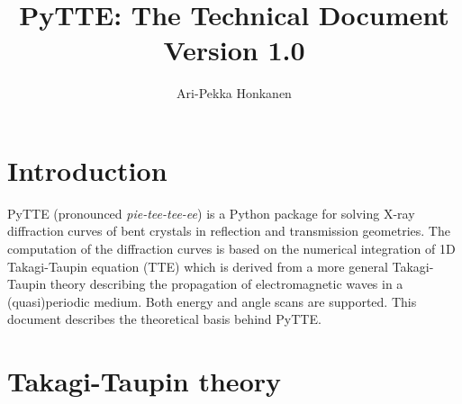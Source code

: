 \documentclass[11pt,a4paper]{article}
\author{Ari-Pekka Honkanen}
\title{PyTTE: The Technical Document\\Version 1.0}
\begin{document}
\maketitle
\section{Introduction}
PyTTE (pronounced \emph{pie-tee-tee-ee}) is a Python package for solving X-ray diffraction curves of bent crystals in reflection and transmission geometries. The computation of the diffraction curves is based on the numerical integration of 1D Takagi-Taupin equation (TTE) which is derived from a more general Takagi-Taupin theory describing the propagation of electromagnetic waves in a (quasi)periodic medium. Both energy and angle scans are supported.
This document describes the theoretical basis behind PyTTE.

\section{Takagi-Taupin theory}
\end{document}

